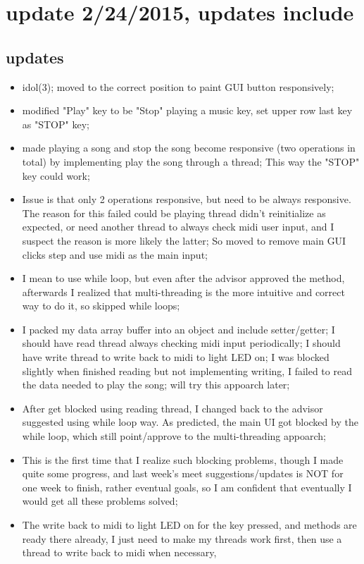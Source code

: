 \documentclass[9pt,b5paper]{article}
\begin{document}
\section{update 2/24/2015, updates include}
\label{sec-4}
\subsection{updates}
\label{sec-4-1}
\begin{itemize}
\item idol(3); moved to the correct position to paint GUI button responsively;
\item modified "Play" key to be "Stop" playing a music key, set upper row last key as "STOP" key;
\item made playing a song and stop the song become responsive (two operations in total) by implementing play the song through a thread; This way the "STOP" key could work;
\item Issue is that only 2 operations responsive, but need to be always responsive. The reason for this failed could be playing thread didn't reinitialize as expected, or need another thread to always check midi user input, and I suspect the reason is more likely the latter; So moved to remove main GUI clicks step and use midi as the main input;
\item I mean to use while loop, but even after the advisor approved the method, afterwards I realized that multi-threading is the more intuitive and correct way to do it, so skipped while loops;
\item I packed my data array buffer into an object and include setter/getter; I should have read thread always checking midi input periodically; I should have write thread to write back to midi to light LED on; I was blocked slightly when finished reading but not implementing writing, I failed to read the data needed to play the song; will try this appoarch later;
\item After get blocked using reading thread, I changed back to the advisor suggested using while loop way. As predicted, the main UI got blocked by the while loop, which still point/approve to the multi-threading appoarch;
\item This is the first time that I realize such blocking problems, though I made quite some progress, and last week's meet suggestions/updates is NOT for one week to finish, rather eventual goals, so I am confident that eventually I would get all these problems solved;
\item The write back to midi to light LED on for the key pressed, and methods are ready there already, I just need to make my threads work first, then use a thread to write back to midi when necessary,
\end{itemize}
\end{document}
